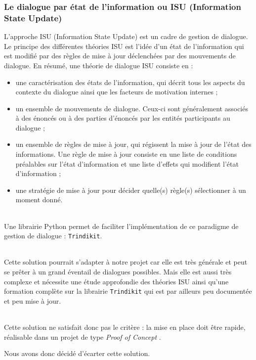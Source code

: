 \subsubsection{Le dialogue par état de l'information ou ISU (Information State Update)}

L'approche ISU\cite{ISU} (Information State Update) est un cadre de gestion de dialogue. Le principe des différentes théories ISU est l'idée d'un état de l'information qui est modifié par des règles de mise à jour déclenchées par des mouvements de dialogue. En résumé, une théorie de dialogue ISU consiste en :
\begin{itemize}
	\item une caractérisation des états de l'information, qui décrit tous les aspects du contexte du dialogue ainsi que les facteurs de motivation internes ;
	\item un ensemble de mouvements de dialogue. Ceux-ci sont généralement associés à des énoncés ou à des parties d'énoncés par les entités participants au dialogue ;
	\item un ensemble de règles de mise à jour, qui régissent la mise à jour de l'état des informations. Une règle de mise à jour consiste en une liste de conditions préalables sur l'état d'information et une liste d'effets qui modifient l'état d'information ;
	\item une stratégie de mise à jour pour décider quelle(s) règle(s) sélectionner à un moment donné.
\end{itemize}

~\\\indent
Une librairie Python permet de faciliter l'implémentation de ce paradigme de gestion de dialogue : \texttt{Trindikit}. 

~\\\indent
Cette solution pourrait s'adapter à notre projet car elle est très générale et peut se prêter à un grand éventail de dialogues possibles. Mais elle est aussi très complexe et nécessite une étude approfondie des théories ISU ainsi qu'une formation complète sur la librairie \texttt{Trindikit} qui est par ailleurs peu documentée et peu mise à jour. 

~\\\indent
Cette solution ne satisfait donc pas le critère : \og la mise en place doit être rapide, réalisable dans un projet de type \textit{Proof of Concept} \fg. 

Nous avons donc décidé d'écarter cette solution.

\FloatBarrier

